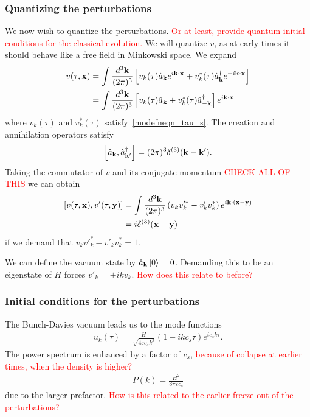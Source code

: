     \subsubsection{Quantizing the perturbations}
    We now wish to quantize the perturbations.
    \textcolor{red}{Or at least, provide quantum initial conditions for the classical evolution.}
    We will quantize $v$,
    as at early times it should behave like a free field in Minkowski space.
    We expand
    \begin{align}\label{operator_expansion}
        v(\tau,\mathbf{x}) &= \int\frac{d^3\mathbf{k}}{(2\pi)^3}\left[
            v_k(\tau)\hat{a}_{\mathbf{k}} e^{i\mathbf{k}\cdot\mathbf{x}}+
            v^*_k(\tau)\hat{a}^{\dagger}_{\mathbf{k}} e^{-i\mathbf{k}\cdot\mathbf{x}}
        \right]\\
            &= \int\frac{d^3\mathbf{k}}{(2\pi)^3}\left[
            v_k(\tau)\hat{a}_{\mathbf{k}} +
            v^*_k(\tau)\hat{a}^{\dagger}_{-\mathbf{k}}
        \right]e^{i\mathbf{k}\cdot\mathbf{x}}
    \end{align}
    where $v_k(\tau)$ and $v^*_k(\tau)$ satisfy~\eqref{modefneqn_tau_s}.
    The creation and annihilation operators satisfy
    \begin{align}\label{creation_annihilation_commutator}
        \left[\hat{a}_{\mathbf{k}},\hat{a}^{\dagger}_{\mathbf{k}'}\right] = (2\pi)^3\delta^{(3)}(\mathbf{k}-\mathbf{k}').
    \end{align}
    Taking the commutator of $v$ and its conjugate momentum
    \textcolor{red}{CHECK ALL OF THIS}
    we can obtain
    \begin{align}
        \left[v(\tau,\mathbf{x}),v'(\tau,\mathbf{y})\right] &=
        \int \frac{d^3 \mathbf{k}}{(2\pi)^3}\left(v_kv'^*_k-v'_kv^*_k\right)e^{i\mathbf{k}\cdot(\mathbf{x}-\mathbf{y})}\\
        &= i \delta^{(3)}(\mathbf{x}-\mathbf{y})
    \end{align}
    if we demand that $v_kv'^*_k-v'_kv^*_k=1$.


    We can define the vacuum state by $\hat{a}_{\mathbf{k}}\left| 0\right>=0$.
    Demanding this to be an eigenstate of $H$ forces $v'_k=\pm ikv_k$.
    \textcolor{red}{How does this relate to before?}

    \subsubsection{Initial conditions for the perturbations}
    The Bunch-Davies vacuum leads us to the mode functions
    \begin{align}\label{uk_solution}
        u_k(\tau) = \frac{H}{\sqrt{4\varepsilon c_s k^3}}\left(1-ikc_s\tau\right)e^{ic_s k\tau}.
    \end{align}
    The power spectrum is enhanced by a factor of $c_s$,
    \textcolor{red}{because of collapse at earlier times, when the density is higher?}
    \begin{align}
        P(k) = \frac{H^2}{8\pi\varepsilon c_s}
    \end{align}
    due to the larger prefactor.
    \textcolor{red}{How is this related to the earlier freeze-out of the perturbations?}

